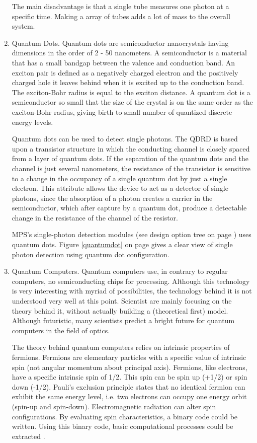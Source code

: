 \begin{enumerate}[i]
The main disadvantage is that a single tube measures one photon at a specific time. Making a array of tubes adds a lot of mass to the overall system. 

\item Quantum Dots. Quantum dots are semiconductor nanocrystals having dimensions in the order of 2 - 50 nanometers. A semiconductor is a material that has a small bandgap between the valence and conduction band. An exciton pair is defined as a negatively charged electron and the positively charged hole it leaves behind when it is excited up to the conduction band. The exciton-Bohr radius is equal to the exciton distance. A quantum dot is a semiconductor so small that the size of the crystal is on the same order as the exciton-Bohr radius, giving birth to small number of quantized discrete energy levels. 

Quantum dots can be used to detect single photons. The \ac{QDRD} is based upon a transistor structure in which the conducting channel is closely spaced from a layer of quantum dots. If the separation of the quantum dots and the channel is just several nanometers, the resistance of the transistor is sensitive to a change in the occupancy of a single quantum dot by just a single electron. This attribute allows the device to act as a detector of single photons, since the absorption of a photon creates a carrier in the semiconductor, which after capture by a quantum dot, produce a detectable change in the resistance of the channel of the resistor.
\cite{quantumdots}

MPS's single-photon detection modules (see design option tree on page \pageref{DOS_receiver}) uses quantum dots.
Figure \ref{quantumdot} on page \pageref{quantumdot} gives a clear view of single photon detection using quantum dot configuration.

\item Quantum Computers. Quantum computers use, in contrary to regular computers, no semiconducting chips for processing. Although this technology is very interesting with myriad of possibilities, the technology behind it is not understood very well at this point. Scientist are mainly focusing on the theory behind it, without actually building a (theoretical first) model. Although futuristic, many scientists predict a bright future for quantum computers in the field of optics.

The theory behind quantum computers relies on intrinsic properties of fermions. Fermions are elementary particles with a specific value of intrinsic spin (not angular momentum about principal axis). Fermions, like electrons, have a specific intrinsic spin of 1/2. This spin can be spin up (+1/2) or spin down (-1/2). Pauli's exclusion principle states that no identical fermion can exhibit the same energy level, i.e. two electrons can occupy one energy orbit (spin-up and spin-down). Electromagnetic radiation can alter spin configurations. By evaluating spin characteristics, a binary code could be written. Using this binary code, basic computational processes could be extracted \cite{quantumcomputers}.

	
\end{enumerate}

